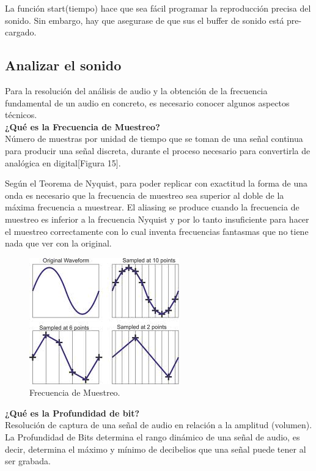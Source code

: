 La función start(tiempo) hace que sea fácil programar la reproducción precisa del sonido. Sin embargo, hay que asegurase de que sus el buffer de sonido está pre-cargado.


\subsection{Analizar el sonido}
\label{sec:analizar_sonido}
Para la resolución del análisis de audio y la obtención de la frecuencia fundamental de un audio en concreto, es necesario conocer algunos aspectos técnicos.\\

\noindent\textbf{¿Qué es la Frecuencia de Muestreo?}\\
Número de muestras por unidad de tiempo que se toman de una señal continua para producir una señal discreta, durante el proceso necesario para convertirla de analógica en digital[Figura 15].


Según el Teorema de Nyquist, para poder replicar con exactitud la forma  de una onda es necesario que la frecuencia de muestreo sea superior al doble de la máxima frecuencia  a  muestrear.
El aliasing se produce cuando la frecuencia de muestreo es inferior a la frecuencia Nyquist y por lo tanto insuficiente para hacer  el muestreo correctamente con lo cual inventa frecuencias fantasmas que no tiene nada que ver con la original.\\

\begin{figure}[h]
 \centering
 \includegraphics[scale=0.7]{../images/muestreo.png}
 \caption{Frecuencia de Muestreo.}
 \label{fig:../images/muestreo.png}
 \end{figure}

\noindent\textbf{¿Qué es la Profundidad de bit?}\\
Resolución de captura de una señal de audio en relación a la amplitud (volumen). La Profundidad de Bits determina el rango dinámico de una señal de audio, es decir, determina el máximo y mínimo de decibelios que una señal puede tener al ser grabada.\\

